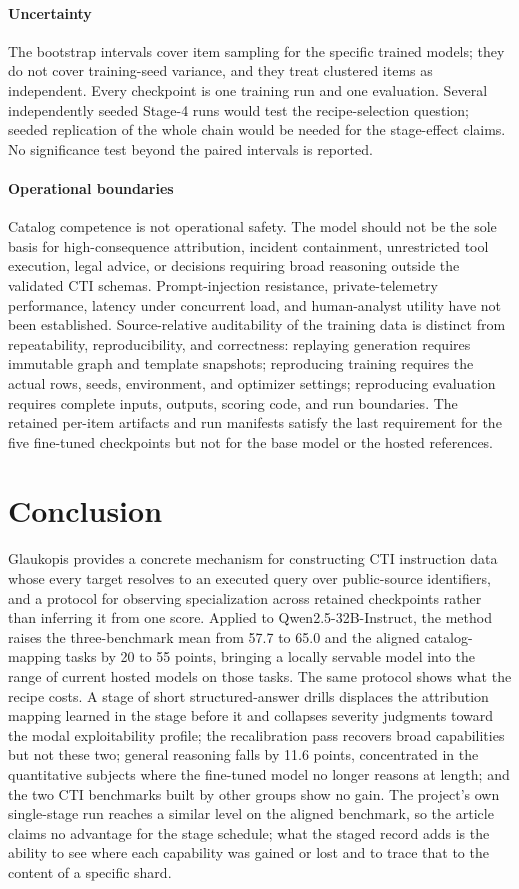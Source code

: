 \documentclass[twocolumn]{svjour3}
\begin{document}
\paragraph{Uncertainty}
The bootstrap intervals cover item sampling for the specific trained models; they do not cover training-seed variance, and they treat clustered items as independent. Every checkpoint is one training run and one evaluation. Several independently seeded Stage-4 runs would test the recipe-selection question; seeded replication of the whole chain would be needed for the stage-effect claims. No significance test beyond the paired intervals is reported.

\paragraph{Operational boundaries}
Catalog competence is not operational safety. The model should not be the sole basis for high-consequence attribution, incident containment, unrestricted tool execution, legal advice, or decisions requiring broad reasoning outside the validated CTI schemas. Prompt-injection resistance, private-telemetry performance, latency under concurrent load, and human-analyst utility have not been established. Source-relative auditability of the training data is distinct from repeatability, reproducibility, and correctness: replaying generation requires immutable graph and template snapshots; reproducing training requires the actual rows, seeds, environment, and optimizer settings; reproducing evaluation requires complete inputs, outputs, scoring code, and run boundaries. The retained per-item artifacts and run manifests satisfy the last requirement for the five fine-tuned checkpoints but not for the base model or the hosted references.

\section{Conclusion}\label{sec:conclusion}
Glaukopis provides a concrete mechanism for constructing CTI instruction data whose every target resolves to an executed query over public-source identifiers, and a protocol for observing specialization across retained checkpoints rather than inferring it from one score. Applied to Qwen2.5-32B-Instruct, the method raises the three-benchmark mean from 57.7 to 65.0 and the aligned catalog-mapping tasks by 20 to 55 points, bringing a locally servable model into the range of current hosted models on those tasks. The same protocol shows what the recipe costs. A stage of short structured-answer drills displaces the attribution mapping learned in the stage before it and collapses severity judgments toward the modal exploitability profile; the recalibration pass recovers broad capabilities but not these two; general reasoning falls by 11.6 points, concentrated in the quantitative subjects where the fine-tuned model no longer reasons at length; and the two CTI benchmarks built by other groups show no gain. The project's own single-stage run reaches a similar level on the aligned benchmark, so the article claims no advantage for the stage schedule; what the staged record adds is the ability to see where each capability was gained or lost and to trace that to the content of a specific shard.
\end{document}
